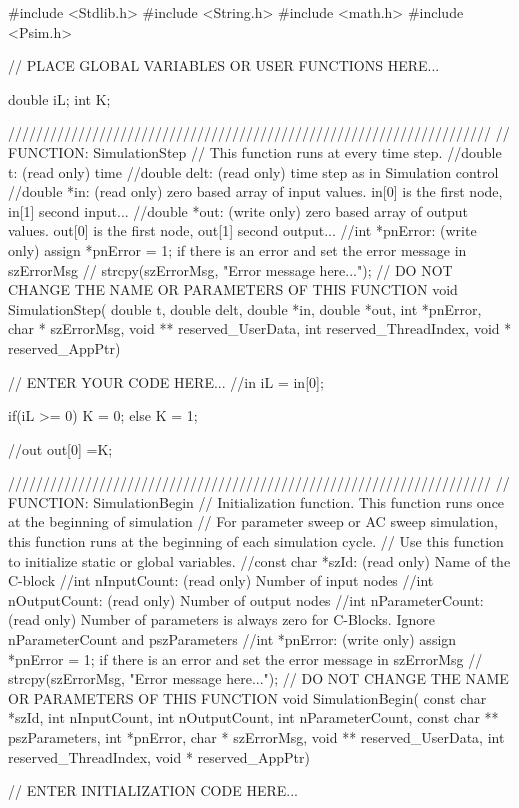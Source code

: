 
\begin{mylisting}[language=c,caption=電流方向検出モジュール,label=hurokuB_denryu]

#include <Stdlib.h>
#include <String.h>
#include <math.h>
#include <Psim.h>

// PLACE GLOBAL VARIABLES OR USER FUNCTIONS HERE...

double iL;
int K;

/////////////////////////////////////////////////////////////////////
// FUNCTION: SimulationStep
//   This function runs at every time step.
//double t: (read only) time
//double delt: (read only) time step as in Simulation control
//double *in: (read only) zero based array of input values. in[0] is the first node, in[1] second input...
//double *out: (write only) zero based array of output values. out[0] is the first node, out[1] second output...
//int *pnError: (write only)  assign  *pnError = 1;  if there is an error and set the error message in szErrorMsg
//    strcpy(szErrorMsg, "Error message here..."); 
// DO NOT CHANGE THE NAME OR PARAMETERS OF THIS FUNCTION
void SimulationStep(
		double t, double delt, double *in, double *out,
		 int *pnError, char * szErrorMsg,
		 void ** reserved_UserData, int reserved_ThreadIndex, void * reserved_AppPtr)
{
// ENTER YOUR CODE HERE...
//in
iL = in[0];

	if(iL >= 0){
	K = 0;
	}else{
	K = 1;
	}

//out
out[0] =K;
}


/////////////////////////////////////////////////////////////////////
// FUNCTION: SimulationBegin
//   Initialization function. This function runs once at the beginning of simulation
//   For parameter sweep or AC sweep simulation, this function runs at the beginning of each simulation cycle.
//   Use this function to initialize static or global variables.
//const char *szId: (read only) Name of the C-block 
//int nInputCount: (read only) Number of input nodes
//int nOutputCount: (read only) Number of output nodes
//int nParameterCount: (read only) Number of parameters is always zero for C-Blocks.  Ignore nParameterCount and pszParameters
//int *pnError: (write only)  assign  *pnError = 1;  if there is an error and set the error message in szErrorMsg
//    strcpy(szErrorMsg, "Error message here..."); 
// DO NOT CHANGE THE NAME OR PARAMETERS OF THIS FUNCTION
void SimulationBegin(
		const char *szId, int nInputCount, int nOutputCount,
		 int nParameterCount, const char ** pszParameters,
		 int *pnError, char * szErrorMsg,
		 void ** reserved_UserData, int reserved_ThreadIndex, void * reserved_AppPtr)
{
// ENTER INITIALIZATION CODE HERE...




}
\end{mylisting}
